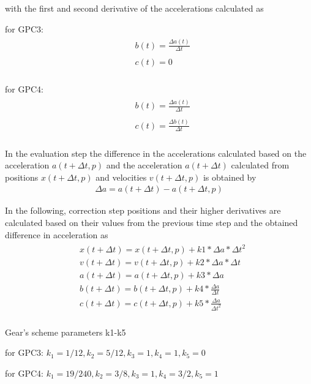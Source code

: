 with the first and second derivative of the accelerations calculated as\par
for GPC3:
\begin{align}\label{eqn:gearJerk3}
    \begin{split}
        &b(t) = \frac{\Delta{a(t)}}{\Delta{t}}\\
        \\
        &c(t) = 0\\
    \end{split}
\end{align}\par
for GPC4:
\begin{align}\label{eqn:gearJerk4}
    \begin{split}
        &b(t) = \frac{\Delta{a(t)}}{\Delta{t}}\\
        \\
        &c(t) = \frac{\Delta{b(t)}}{\Delta{t}}\\
    \end{split}
\end{align}
\par
In the evaluation step the difference in the accelerations calculated based on
the acceleration $a(t+ \Delta{t}, p)$ and the acceleration $a(t+\Delta{t})$
calculated from positions $x(t+\Delta{t}, p)$ and velocities $v(t+\Delta{t}, p)$
is obtained by
\begin{align}\label{eqn:gearDa}
    \Delta{a} = a(t + \Delta{t}) - a(t + \Delta{t}, p)
\end{align}
\par
In the following, correction step positions and their higher derivatives are
calculated based on their values from the previous time step and the obtained
difference in acceleration as
\begin{align}\label{eqn:gearCorrector}
    \begin{split}
        &x(t+\Delta{t}) = x(t+\Delta{t}, p) + k1 * \Delta{a} * \Delta{t}^2\\
        &v(t+\Delta{t}) = v(t+\Delta{t}, p) + k2 * \Delta{a} * \Delta{t}\\
        &a(t+\Delta{t}) = a(t+\Delta{t}, p) + k3 * \Delta{a}\\
        &b(t+\Delta{t}) = b(t+\Delta{t}, p) + k4 * \frac{\Delta{a}}{\Delta{t}}\\
        &c(t+\Delta{t}) = c(t+\Delta{t}, p) + k5 * \frac{\Delta{a}}{\Delta{t}^2}\\
    \end{split}
\end{align}
\par
Gear’s scheme parameters k1-k5\par
for GPC3:
$k_1 = 1/12, k_2 = 5/12, k_3 = 1, k_4 = 1, k_5 = 0$\par
for GPC4:
$k_1 = 19/240, k_2 = 3/8, k_3 = 1, k_4 = 3/2, k_5 = 1$
\par
\newpage